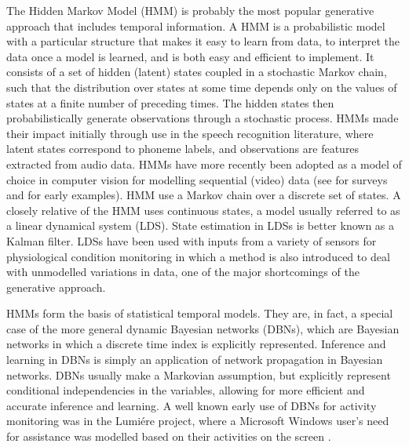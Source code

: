 The Hidden Markov Model (HMM) is probably the most popular generative approach that includes temporal information. A HMM is a probabilistic model with a particular structure that makes it easy to learn from data, to interpret the data once a model is learned, and is both easy and efficient to implement. It consists of a set of hidden (latent) states coupled in a stochastic Markov chain, such that the distribution over states at some time depends only on the values of states at a finite number of preceding times. The hidden states then probabilistically generate observations through a stochastic process. HMMs made their impact initially through use in the speech recognition literature, where latent states correspond to phoneme labels, and observations are features extracted from audio data. HMMs have more recently been adopted as a model of choice in computer vision for modelling sequential (video) data (see \cite{Gavrila1999} \cite{Moeslund2006} for surveys and \cite{Galata1999} \cite{Starner1995} for early examples). HMM use a Markov chain over a discrete set of states. A closely relative of the HMM uses continuous states, a model usually referred to as a linear dynamical system (LDS). State estimation in LDSs is better known as a Kalman filter. LDSs have been used with inputs from a variety of sensors for physiological condition monitoring \cite{Quinn2009} in which a method is also introduced to deal with unmodelled variations in data, one of the major shortcomings of the generative approach.

HMMs form the basis of statistical temporal models. They are, in fact, a special case of the more general dynamic Bayesian networks (DBNs), which are Bayesian networks in which a discrete time index is explicitly represented. Inference and learning in DBNs is simply an application of network propagation in Bayesian networks. DBNs usually make a Markovian assumption, but explicitly represent conditional independencies in the variables, allowing for more efficient and accurate inference and learning. A well known early use of DBNs for activity monitoring was in the Lumi\'ere project, where a Microsoft Windows user’s need for assistance was modelled based on their activities on the screen \cite{Horvitz1998}.

